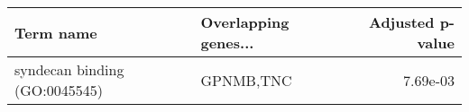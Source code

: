 \begin{tabular}{llr}
\toprule
                    Term name & Overlapping genes... &  Adjusted p-value \\
\midrule
syndecan binding (GO:0045545) &            GPNMB,TNC &          7.69e-03 \\
\bottomrule
\end{tabular}
